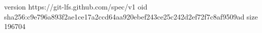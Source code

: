 version https://git-lfs.github.com/spec/v1
oid sha256:c9e796a893f2ae1ce17a2ccd64aa920ebef243ce25c242d2ef72f7c8af9509ad
size 196704
